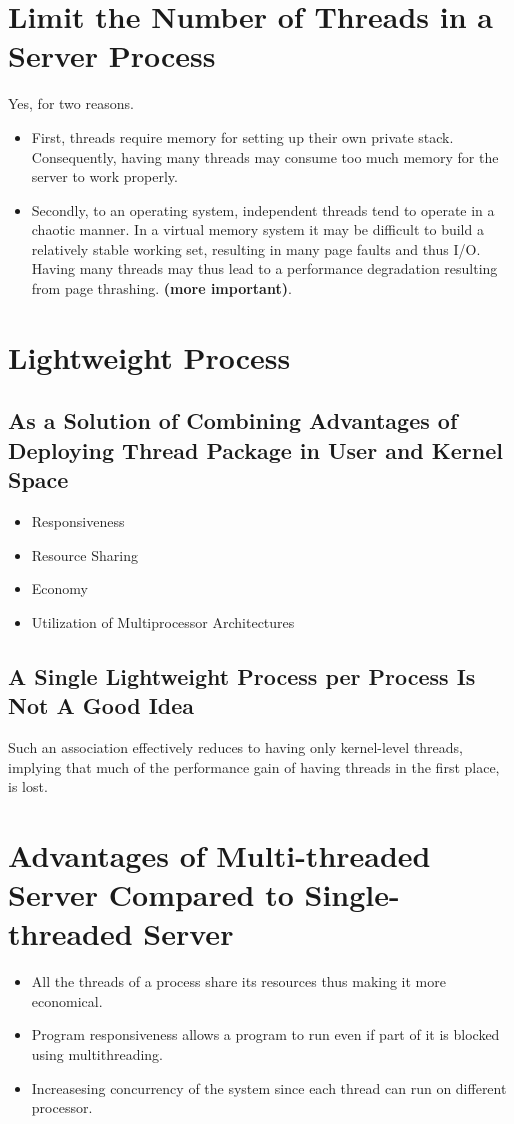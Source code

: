 \documentclass[11pt,a4paper]{article}
\begin{document}
  	\section{Limit the Number of Threads in a Server Process}
  	Yes, for two reasons. 
  	\begin{itemize}
  		\item First, threads require memory for setting up their own private stack. Consequently, having many threads may consume too much memory for the server to work properly.
  		\item Secondly, to an operating system, independent threads tend to operate in a chaotic manner. In a virtual memory system it may be difficult to build a relatively stable working set, resulting in many page faults and thus I/O. Having many threads may thus lead to a performance degradation resulting from page thrashing. \textbf{(more important)}.
  	\end{itemize}
  	
  	\section{Lightweight Process}
  		\subsection{As a Solution of Combining Advantages of Deploying Thread Package in User and Kernel Space}
  		\begin{itemize}
  			\item Responsiveness
  			\item Resource Sharing
  			\item Economy
  			\item Utilization of Multiprocessor Architectures
  		\end{itemize}
  		\subsection{A Single Lightweight Process per Process Is Not A Good Idea}
  		Such an association effectively reduces to having only kernel-level
threads, implying that much of the performance gain of having threads in the
first place, is lost.

	\section{Advantages of Multi-threaded Server Compared to Single-threaded Server}
	\begin{itemize}
		\item All the threads of a process share its resources thus making it more economical.
		\item Program responsiveness allows a program to run even if part of it is blocked using multithreading.
		\item Increasesing concurrency of the system since each thread can run on different processor.
	\end{itemize}
\end{document}
